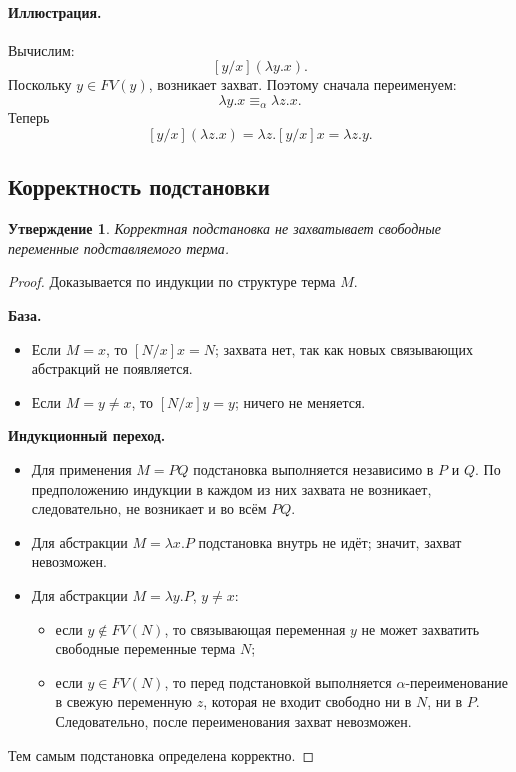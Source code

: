 \documentclass[12pt,a4paper]{article}
\newtheorem{proposition}{Утверждение}
\theoremstyle{remark}
\begin{document}
\paragraph{Иллюстрация.}
Вычислим:
\[
[y/x](\lambda y.x).
\]
Поскольку $y\in FV(y)$, возникает захват. Поэтому сначала переименуем:
\[
\lambda y.x \equiv_\alpha \lambda z.x.
\]
Теперь
\[
[y/x](\lambda z.x)=\lambda z.[y/x]x=\lambda z.y.
\]

\subsection{Корректность подстановки}

\begin{proposition}
Корректная подстановка не захватывает свободные переменные подставляемого терма.
\end{proposition}

\begin{proof}
Доказывается по индукции по структуре терма $M$.

\textbf{База.}
\begin{itemize}
    \item Если $M=x$, то $[N/x]x=N$; захвата нет, так как новых связывающих абстракций не появляется.
    \item Если $M=y\neq x$, то $[N/x]y=y$; ничего не меняется.
\end{itemize}

\textbf{Индукционный переход.}
\begin{itemize}
    \item Для применения $M=PQ$ подстановка выполняется независимо в $P$ и $Q$. По предположению индукции в каждом из них захвата не возникает, следовательно, не возникает и во всём $PQ$.
    \item Для абстракции $M=\lambda x.P$ подстановка внутрь не идёт; значит, захват невозможен.
    \item Для абстракции $M=\lambda y.P$, $y\neq x$:
    \begin{itemize}
        \item если $y\notin FV(N)$, то связывающая переменная $y$ не может захватить свободные переменные терма $N$;
        \item если $y\in FV(N)$, то перед подстановкой выполняется $\alpha$-переименование в свежую переменную $z$, которая не входит свободно ни в $N$, ни в $P$. Следовательно, после переименования захват невозможен.
    \end{itemize}
\end{itemize}
Тем самым подстановка определена корректно.
\end{proof}
\end{document}

